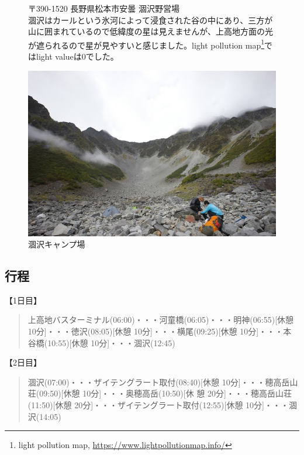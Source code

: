 \documentclass[../main]{subfiles}
\begin{document}
\begin{figure}
\begin{minipage}{0.45\textwidth} %
  〒390-1520 長野県松本市安曇 涸沢野営場 \\

  涸沢はカールという氷河によって浸食された谷の中にあり、三方が山に囲まれているので低緯度の星は見えませんが、上高地方面の光が遮られるので星が見やすいと感じました。light pollution map\footnote{light pollution map, \url{https://www.lightpollutionmap.info/}}ではlight valueは0でした。
\end{minipage}%
\hfill
\begin{minipage}{0.45\textwidth} %
    \centering
    \includegraphics[width=\linewidth]{sections/mori/IMG_2413.jpg} %
    \caption{涸沢キャンプ場}
\end{minipage}
\end{figure}

\subsection{行程}
【1日目】
\begin{quote}
  上高地バスターミナル(06:00)・・・河童橋(06:05)・・・明神(06:55)[休憩 10分]・・・徳沢(08:05)[休憩 10分]・・・横尾(09:25)[休憩 10分]・・・本谷橋(10:55)[休憩 10分]・・・涸沢(12:45)
\end{quote}

【2日目】
\begin{quote}
  涸沢(07:00)・・・ザイテングラート取付(08:40)[休憩 10分]・・・穂高岳山荘(09:50)[休憩 10分]・・・奥穂高岳(10:50)[休
  憩 20分]・・・穂高岳山荘(11:50)[休憩 20分]・・・ザイテングラート取付(12:55)[休憩 10分]・・・涸沢(14:05)
\end{quote}
\end{document}
